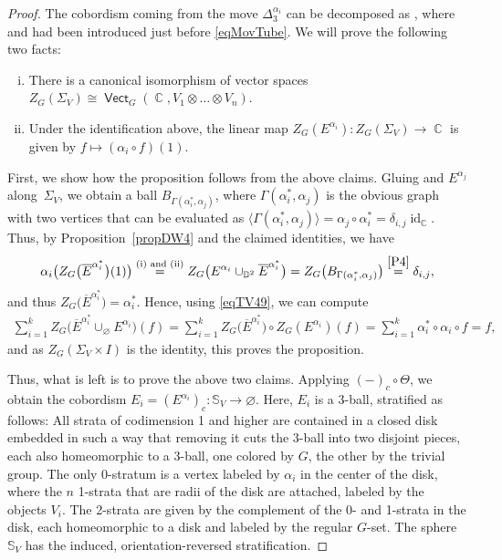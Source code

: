 \documentclass[10pt,a4paper]{amsart}
\DeclareMathOperator{\id}{id}
\DeclareMathOperator{\vect}{\mathsf{Vect}}
\DeclareMathOperator{\C}{\mathbb{C}}
\numberwithin{equation}{section}
\theoremstyle{definition}
\begin{document}
\begin{proof}
 The cobordism coming from the move $\Delta_3^{\alpha_i}$ can be decomposed as , where~ and  had been introduced just before \eqref{eqMovTube}. We will prove the following two facts:
 \begin{enumerate}[(i)]\itemsep=0pt
 \item There is a canonical isomorphism of vector spaces $Z_G(\Sigma_V) \cong \vect_G (\C, V_1 \otimes \dots \otimes V_n )$.
 \item Under the identification above, the linear map $Z_G(E^{\alpha_i})\colon Z_G(\Sigma_V) \rightarrow \C$ is given by $f \mapsto (\alpha_i \circ f)(1)$.
 \end{enumerate}
 First, we show how the proposition follows from the above claims. Gluing  and $E^{\alpha_j}$ along~$\Sigma_V$, we obtain a ball $B_{\Gamma(\alpha_i^*, \alpha_j)}$, where $\Gamma(\alpha_i^*, \alpha_j)$ is the obvious graph with two vertices that can be evaluated as $\langle \Gamma(\alpha_i^*, \alpha_j)\rangle = \alpha_j \circ \alpha_i^* = \delta_{i,j}\id_{\C}$. Thus, by Proposition~\ref{propDW4} and the claimed identities, we have
 \begin{align*}
 \alpha_i\bigl(Z_G\bigl(\overline{E}^{\alpha_i^*}\bigr)(1)\bigr) \overset{\text{(i) and (ii)}}{=} Z_G\bigl(E^{\alpha_i} \cup_{\mathbb{D}^2} \overline{E}^{\alpha_i^*}\bigr) = Z_G\bigl(B_{\Gamma(\alpha_i^*, \alpha_j)}\bigr) \overset{\ref{P4}}{=} \delta_{i,j},
 \end{align*}
 and thus $Z_G\bigl(\overline{E}^{\alpha_i^*}\bigr) = \alpha_i^*$. Hence, using \eqref{eqTV49}, we can compute{\samepage
 \begin{align*}
 \sum_{i = 1}^k Z_G\bigl(\overline{E}^{\alpha_i^*} \cup_{\varnothing} E^{\alpha_i}\bigr)(f) = \sum_{i = 1}^kZ_G\bigl(\overline{E}^{\alpha_i^*}\bigr) \circ Z_G(E^{\alpha_i})(f) = \sum_{i = 1}^k \alpha_i^* \circ \alpha_i \circ f = f,
 \end{align*}
 and as $Z_G(\Sigma_V \times I)$ is the identity, this proves the proposition.}

 Thus, what is left is to prove the above two claims. Applying $(-)_c \circ \Theta$, we obtain the cobordism $E_i = (E^{\alpha_i})_c\colon \mathbb{S}_V \rightarrow \varnothing$. Here, $E_i$ is a 3-ball, stratified as follows: All strata of codimension 1 and higher are contained in a closed disk embedded in such a way that removing it cuts the 3-ball into two disjoint pieces, each also homeomorphic to a 3-ball, one colored by $G$, the other by the trivial group. The only 0-stratum is a vertex labeled by $\alpha_i$ in the center of the disk, where the $n$ 1-strata that are radii of the disk are attached, labeled by the objects $V_i$. The 2-strata are given by the complement of the 0- and 1-strata in the disk, each homeomorphic to a disk and labeled by the regular $G$-set. The sphere $\mathbb{S}_V$ has the induced, orientation-reversed stratification.


\end{proof}
\end{document}
